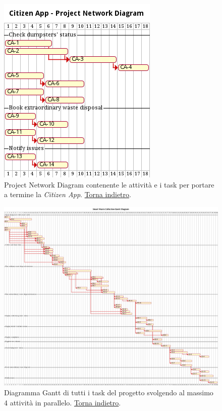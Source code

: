 \begin{figure}[H]
    \centering
    \includegraphics[width=\textwidth]{../img/gantt-citizen-app.pm}
    \caption{Project Network Diagram contenente le attività e i task per portare a termine la \textit{Citizen App}. \hyperlink{back:gantt-citizen-app}{Torna indietro}.}
    \label{fig:gantt-citizen-app}
\end{figure}

\begin{figure}[H]
    \centering
    \includegraphics[width=\textwidth]{../img/gantt.pm}
    \caption{Diagramma Gantt di tutti i task del progetto svolgendo al massimo 4 attività in parallelo.  \hyperlink{back:gantt}{Torna indietro}.}
    \label{fig:gantt}
\end{figure}

